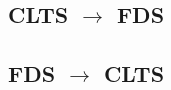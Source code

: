 \documentclass{article}
\begin{document}
%

%

%

\subsection{CLTS $\rightarrow$ FDS}


\subsection{FDS $\rightarrow$ CLTS}


%

%
%
%


\end{document}
